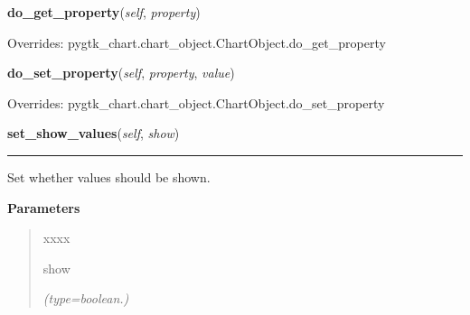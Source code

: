 \hspace{.8\funcindent}\begin{boxedminipage}{\funcwidth}

    \raggedright \textbf{do\_get\_property}(\textit{self}, \textit{property})

\setlength{\parskip}{2ex}
\setlength{\parskip}{1ex}
      Overrides: pygtk\_chart.chart\_object.ChartObject.do\_get\_property

    \end{boxedminipage}

    \vspace{0.5ex}

\hspace{.8\funcindent}\begin{boxedminipage}{\funcwidth}

    \raggedright \textbf{do\_set\_property}(\textit{self}, \textit{property}, \textit{value})

\setlength{\parskip}{2ex}
\setlength{\parskip}{1ex}
      Overrides: pygtk\_chart.chart\_object.ChartObject.do\_set\_property

    \end{boxedminipage}

    \label{pygtk_chart:bar_chart:Grid:set_show_values}

    \vspace{0.5ex}

\hspace{.8\funcindent}\begin{boxedminipage}{\funcwidth}

    \raggedright \textbf{set\_show\_values}(\textit{self}, \textit{show})

    \vspace{-1.5ex}

    \rule{\textwidth}{0.5\fboxrule}
\setlength{\parskip}{2ex}
    Set whether values should be shown.

\setlength{\parskip}{1ex}
      \textbf{Parameters}
      \vspace{-1ex}

      \begin{quote}
        \begin{Ventry}{xxxx}

          \item[show]

            {\it (type=boolean.)}

        \end{Ventry}

      \end{quote}

    \end{boxedminipage}

